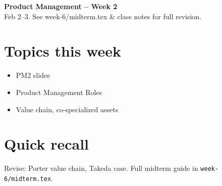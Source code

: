 \documentclass[10pt,a4paper]{article}
\begin{document}
\begin{center}
{\large\bfseries\color{eublue} Product Management -- Week 2}\\[0.2em]
\footnotesize Feb 2--3. See week-6/midterm.tex \& class notes for full revision.
\end{center}\vspace{0.5em}

\section*{\color{eublue}Topics this week}
\begin{itemize}
\item PM2 slides
\item Product Management Roles
\item Value chain, co-specialized assets
\end{itemize}

\section*{Quick recall}
Revise: Porter value chain, Takeda case. Full midterm guide in \texttt{week-6/midterm.tex}.
\end{document}
